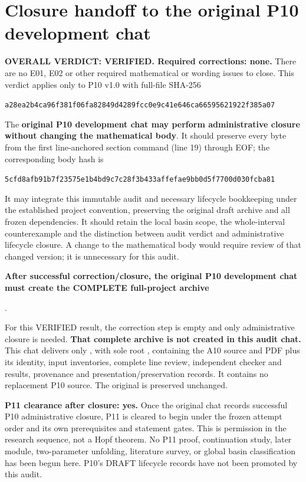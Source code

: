 \documentclass[11pt]{article}
\begin{document}
\section{Closure handoff to the original P10 development chat}
\label{sec:handoff}
\textbf{OVERALL VERDICT: VERIFIED. Required corrections: none.}
There are no E01, E02 or other required mathematical or wording issues to
close. This verdict applies only to P10 v1.0 with full-file SHA-256
\begin{center}\small
\nolinkurl{a28ea2b4ca96f381f06fa82849d4289fcc0e9c41e646ca66595621922f385a07}
\end{center}
The \textbf{original P10 development chat may perform administrative closure
without changing the mathematical body}. It should preserve every byte from
the first line-anchored section command (line 19) through EOF; the corresponding
body hash is
\begin{center}\small
\nolinkurl{5cfd8afb91b7f23575e1b4bd9c7c28f3b433affefae9bb0d5f7700d030fcba81}
\end{center}
It may integrate this immutable audit and necessary lifecycle bookkeeping
under the established project convention, preserving the original draft
archive and all frozen dependencies. It should retain the local basin scope,
the whole-interval counterexample and the distinction between audit verdict
and administrative lifecycle closure. A change to the mathematical body
would require review of that changed version; it is unnecessary for this audit.

\textbf{After successful correction/closure, the original P10 development
chat must create the COMPLETE full-project archive}
\begin{center}
.
\end{center}
For this VERIFIED result, the correction step is empty and only administrative
closure is needed. \textbf{That complete archive is not created in this audit
chat.} This chat delivers only
, with sole root
, containing the A10 source and PDF plus its
identity, input inventories, complete line review, independent checker and
results, provenance and presentation/preservation records. It contains no
replacement P10 source. The original
 is preserved unchanged.

\textbf{P11 clearance after closure: yes.} Once the original chat records
successful P10 administrative closure, P11 is cleared to begin under the
frozen attempt order and its own prerequisites and statement gates. This is
permission in the research sequence, not a Hopf theorem. No P11 proof,
continuation study, later module, two-parameter unfolding, literature survey,
or global basin classification has been begun here. P10's DRAFT lifecycle
records have not been promoted by this audit.
\end{document}
